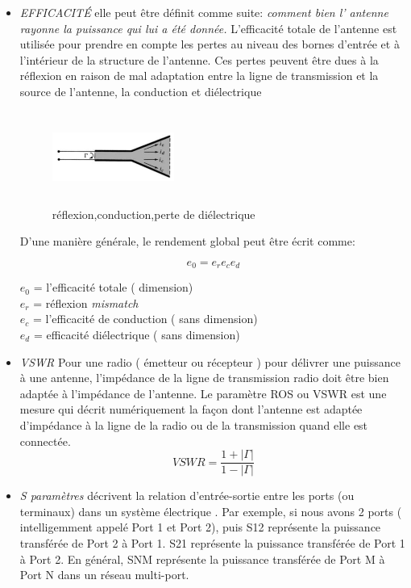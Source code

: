 \documentclass[11pt, a4paper, twoside]{book}
\begin{document}
\begin{itemize}
\item \emph{EFFICACITÉ} elle peut être définit comme suite: \emph{comment bien l' antenne rayonne la puissance qui lui a été donnée.} L'efficacité totale de l'antenne est utilisée pour prendre en compte les pertes au niveau des bornes d'entrée et à l'intérieur de la structure de l'antenne. Ces pertes peuvent être dues à la réflexion en raison de mal adaptation entre la ligne de transmission et la source de l'antenne, la conduction et diélectrique

\begin{figure}[H]
\centering
\includegraphics[width=4cm,height=3cm]{wellwellwell}
\caption{réflexion,conduction,perte de diélectrique}
\end{figure}
D'une manière générale, le rendement global peut être écrit comme:

\begin{equation}
e_{0}=e_{r}e_{c}e_{d}
\end{equation}

\(e_{0}\) = l'efficacité totale ( dimension)\\
\(e_{r}\) = réflexion \emph{ mismatch} \\
\(e_{c}\) = l'efficacité de conduction ( sans dimension)\\
\(e_{d}\) = efficacité diélectrique ( sans dimension)\\

\item \emph{VSWR} 
Pour une radio ( émetteur ou récepteur ) pour délivrer une puissance à une antenne, l'impédance de la ligne de transmission radio doit être bien adaptée à l'impédance de l'antenne. Le paramètre ROS ou VSWR est une mesure qui décrit numériquement la façon dont l'antenne est adaptée d'impédance à la ligne de la radio ou de la transmission quand elle est connectée.
\begin{equation}
VSWR = \dfrac{1+ |\Gamma|}{1-|\Gamma|}
\end{equation}

\item \emph{S paramètres}
décrivent la relation d'entrée-sortie entre les ports (ou terminaux) dans un système électrique . Par exemple, si nous avons 2 ports ( intelligemment appelé Port 1 et Port 2), puis S12 représente la puissance transférée de Port 2 à Port 1. S21 représente la puissance transférée de Port 1 à Port 2. En général, SNM représente la puissance transférée de Port M à Port N dans un réseau multi-port.
\end{itemize}
\end{document}
